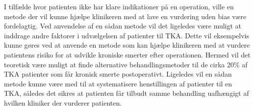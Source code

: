 I tilfælde hvor patienten ikke har klare indikationer på en operation, ville en metode der vil kunne hjælpe klinikeren med at lave en vurdering uden bias være fordelagtig. Ved anvendelse af en sådan metode vil det ligeledes være muligt at inddrage andre faktorer i udvælgelsen af patienter til TKA. Dette vil eksempelvis kunne gøres ved at anvende en metode som kan hjælpe klinikeren med at vurdere patientens risiko for at udvikle kroniske smerter efter operationen. Hermed vil det teoretisk være muligt at finde alternative behandlingsmetoder til de cirka 20\% af TKA patienter som får kronisk smerte postoperativt. Ligeledes vil en sådan metode kunne være med til at systematisere henstillingen af patienter til en TKA, således det sikres at patienten får tilbudt samme behandling uafhængigt af hvilken kliniker der vurderer patienten. 



   
